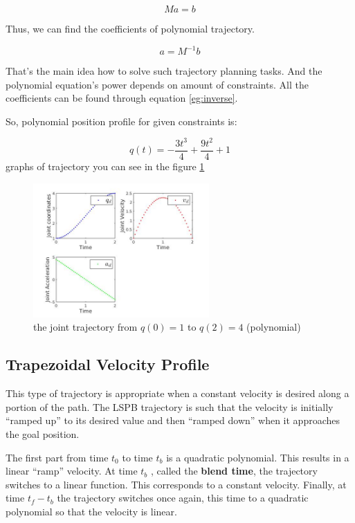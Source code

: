 \documentclass[12pt, a4paper]{report}
\begin{document}
\begin{equation}
	Ma = b
\end{equation}

Thus, we can find the coefficients of polynomial trajectory.

\begin{equation}
	a = M^{-1}b
	\label{eg:inverse}
\end{equation}

That's the main idea how to solve such trajectory planning tasks. And the polynomial equation's power depends on amount of constraints. All the coefficients can be found through equation \ref{eg:inverse}.

So, polynomial position profile for given constraints is:

\begin{equation}
q(t) = -\frac{3t^3}{4} + \frac{9t^2}{4} + 1
\end{equation}
graphs of trajectory you can see in the figure \ref{fig:mesh1}
\begin{figure}[H]
	\centering
		\includegraphics[width=0.6\textwidth]{11} %
	\caption{the joint trajectory from $q(0) = 1$ to $q(2) = 4$ (polynomial)} %
	\label{fig:mesh1}
\end{figure}


{\centering
\subsection*{Trapezoidal Velocity Profile} \label{sec: 1Trap}
}
%

This type of trajectory is appropriate when a constant velocity is desired along a portion of the path. The LSPB
trajectory is such that the velocity is initially “ramped up” to its desired value
and then “ramped down” when it approaches the goal position.

The first part from time $t_0$ to
time $t_b$ is a quadratic polynomial. This results in a linear “ramp” velocity. At
time $t_b$ , called the \textbf{blend time}, the trajectory switches to a linear function. This corresponds to a constant velocity. Finally, at time $t_f - t_b$ the trajectory switches once again, this time to a quadratic polynomial so that the velocity is linear.
\end{document}
